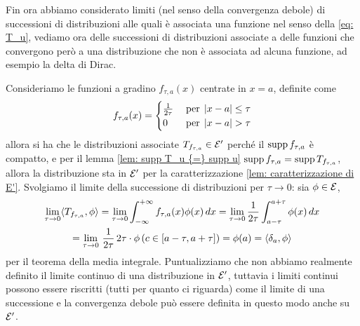 Fin ora abbiamo considerato limiti (nel senso della convergenza debole) di successioni di distribuzioni alle quali è associata una funzione 
nel senso della \eqref{eq: T_u}, vediamo ora delle successioni di distribuzioni associate a delle funzioni che convergono però a una 
distribuzione che non è associata ad alcuna funzione, ad esempio la delta di Dirac.

Consideriamo le funzioni a gradino $ f_{\tau, a}(x) $ centrate in $ x = a $, definite come 
\begin{align}
  f_{\tau, a}(x) = 
  \begin{cases}
    \frac1{2\tau} \; &\textnormal{per}\; \left|{x - a}\right| \leq \tau
    \\
     0 \; &\textnormal{per}\; \left|{x - a}\right| > \tau
  \end{cases}
\end{align}
allora si ha che le distribuzioni associate $ T_{f_{\tau,a}} \in \mathcal{E}' $ perché il $ \operatorname{\textnormal{supp}} f_{\tau,a} $  è compatto, e per il lemma 
\ref{lem: supp T_u {=} supp u} $ \operatorname{\textnormal{supp}} f_{\tau,a} = \operatorname{\textnormal{supp}} T_{f_{\tau,a}} $, allora la distribuzione sta in $ \mathcal{E}' $ per la caratterizzazione 
\ref{lem: caratterizzazione di E'}. Svolgiamo il limite della successione di distribuzioni per $ \tau \to 0 $: sia $ \phi \in \E $,
\begin{gather}
  \lim_{\tau \to 0} \sc{T_{f_{\tau,a}}, \phi} = \lim_{\tau \to 0} \int_{-\infty}^{+\infty} f_{\tau,a}(x) \phi(x) \, dx 
  = \lim_{\tau \to 0} \frac1{2\tau} \int_{a-\tau}^{a + \tau} \phi(x)\,dx
  \\
  = \lim_{\tau \to 0} \,\frac1{2\tau}\, 2\tau \cdot \phi\left( c \in [a - \tau, a + \tau] \right) = \phi(a) = \sc{\delta_a,\phi} 
\end{gather}
per il teorema della media integrale. Puntualizziamo che non abbiamo realmente definito il limite continuo di una distribuzione in $ \mathcal{E}' $, tuttavia 
i limiti continui possono essere riscritti (tutti per quanto ci riguarda) come il limite di una successione e la convergenza debole può essere definita 
in questo modo anche su $ \mathcal{E}' $.

